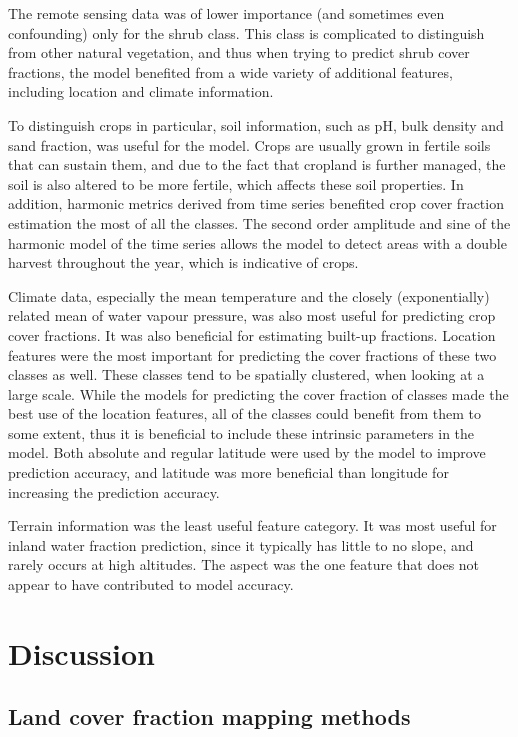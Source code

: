 \documentclass[review,authoryear,3p]{elsarticle}
\begin{document}
The remote sensing data was of lower importance (and sometimes even confounding) only for the shrub class.
This class is complicated to distinguish from other natural vegetation, and thus when trying to predict shrub cover fractions, the model benefited from a wide variety of additional features, including location and climate information.

To distinguish crops in particular, soil information, such as pH, bulk density and sand fraction, was useful for the model.
Crops are usually grown in fertile soils that can sustain them, and due to the fact that cropland is further managed, the soil is also altered to be more fertile, which affects these soil properties.
In addition, harmonic metrics derived from time series benefited crop cover fraction estimation the most of all the classes.
The second order amplitude and sine of the harmonic model of the time series allows the model to detect areas with a double harvest throughout the year, which is indicative of crops.

Climate data, especially the mean temperature and the closely (exponentially) related mean of water vapour pressure, was also most useful for predicting crop cover fractions.
It was also beneficial for estimating built-up fractions.
Location features were the most important for predicting the cover fractions of these two classes as well.
These classes tend to be spatially clustered, when looking at a large scale.
While the models for predicting the cover fraction of classes made the best use of the location features, all of the classes could benefit from them to some extent, thus it is beneficial to include these intrinsic parameters in the model.
Both absolute and regular latitude were used by the model to improve prediction accuracy, and latitude was more beneficial than longitude for increasing the prediction accuracy.

Terrain information was the least useful feature category.
It was most useful for inland water fraction prediction, since it typically has little to no slope, and rarely occurs at high altitudes.
The aspect was the one feature that does not appear to have contributed to model accuracy.

\section{Discussion}

\subsection{Land cover fraction mapping methods}
\end{document}
